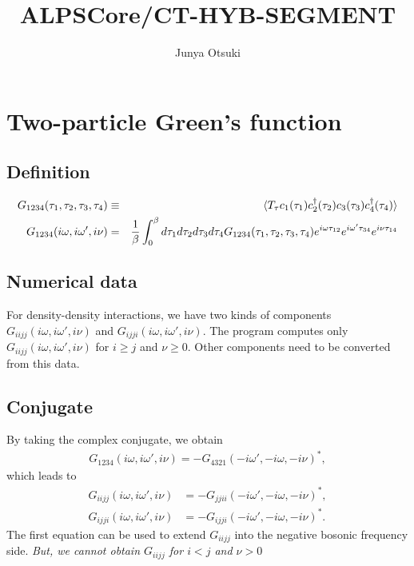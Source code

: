 \documentclass[disablejfam,12pt]{article}
\author{Junya Otsuki}
\begin{document}
\title{ALPSCore/CT-HYB-SEGMENT}
\maketitle
\thispagestyle{empty}

\section{Two-particle Green's function}

\subsection{Definition}
\begin{eqnarray}
 G_{1234}(\tau_1, \tau_2, \tau_3, \tau_4) &\equiv& \braket{T_\tau c_1(\tau_1) c_2^\dagger(\tau_2) c_3(\tau_3) c_4^\dagger(\tau_4)}\\
 G_{1234}(i \omega, i \omega', i\nu) &=& \frac{1}{\beta} \int_0^\beta  d \tau_{1} d \tau_{2} d \tau_{3} d \tau_{4} G_{1234}(\tau_{1}, \tau_{2}, \tau_{3}, \tau_{4}) e^{i\omega \tau_{12}} e^{i\omega' \tau_{34}}e^{i \nu \tau_{14}}
\end{eqnarray}

\subsection{Numerical data}
For density-density interactions, we have two kinds of components
$G_{iijj}(i\omega, i\omega', i\nu)$ and
$G_{ijji}(i\omega, i\omega', i\nu)$.
The program computes only
$G_{iijj}(i\omega, i\omega', i\nu)$ for $i \geq j$ and $\nu \geq 0$.
Other components need to be converted from this data.

\subsection{Conjugate}
By taking the complex conjugate, we obtain
\begin{align}
	G_{1234}(i \omega, i \omega', i\nu) = - G_{4321}(-i \omega', -i \omega, -i\nu)^*,
	\label{eq:conjugate}
\end{align}
which leads to
\begin{align}
	G_{iijj}(i \omega, i \omega', i\nu) &= - G_{jjii}(-i \omega', -i \omega, -i\nu)^*,
	\\
	G_{ijji}(i \omega, i \omega', i\nu) &= - G_{ijji}(-i \omega', -i \omega, -i\nu)^*.
\end{align}
The first equation can be used to extend $G_{iijj}$ into the negative bosonic frequency side.
\emph{But, we cannot obtain $G_{iijj}$ for $i<j$ and $\nu>0$}
\end{document}
